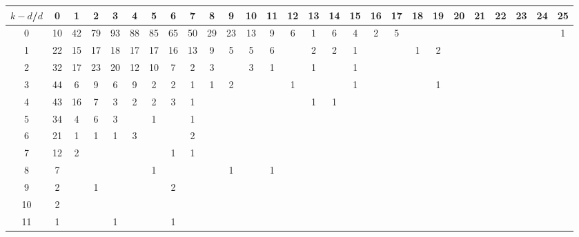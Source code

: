 \documentclass{article}[12pt]
\begin{document}
\begin{landscape}

\begin{table}[h]\footnotesize
{\centering
\begin{tabular}{|c|c|
c|c|c|c|c|c|c|c|c|c|c|c|c|c|c|c|c|c|c|c|c|c|c|c|c|}
  \hline
  $k-d$/$d$ 
 & 0 & 1 & 2 & 3 & 4 & 5 & 6 & 7 & 8 & 9 & 10 & 11 & 12 & 13 & 14 & 15 & 16 & 17 & 18 & 19 & 20 & 21 & 22 & 23 & 24 & 25\\

  \hline
  \hline

0  & 10 & 42 & 79 & 93 & 88 & 85 & 65 & 50 & 29 & 23 & 13 & 9 & 6 & 1 & 6 & 4 & 2 & 5 &  &  &  &  &  &  &  & 1\\

1  & 22 & 15 & 17 & 18 & 17 & 17 & 16 & 13 & 9 & 5 & 5 & 6 &  & 2 & 2 & 1 &  &  & 1 & 2 &  &  &  &  &  & \\

2  & 32 & 17 & 23 & 20 & 12 & 10 & 7 & 2 & 3 &  & 3 & 1 &  & 1 &  & 1 &  &  &  &  &  &  &  &  &  & \\

3  & 44 & 6 & 9 & 6 & 9 & 2 & 2 & 1 & 1 & 2 &  &  & 1 &  &  & 1 &  &  &  & 1 &  &  &  &  &  & \\

4  & 43 & 16 & 7 & 3 & 2 & 2 & 3 & 1 &  &  &  &  &  & 1 & 1 &  &  &  &  &  &  &  &  &  &  & \\

5  & 34 & 4 & 6 & 3 &  & 1 &  & 1 &  &  &  &  &  &  &  &  &  &  &  &  &  &  &  &  &  & \\

6  & 21 & 1 & 1 & 1 & 3 &  &  & 2 &  &  &  &  &  &  &  &  &  &  &  &  &  &  &  &  &  & \\

7  & 12 & 2 &  &  &  &  & 1 & 1 &  &  &  &  &  &  &  &  &  &  &  &  &  &  &  &  &  & \\

8  & 7 &  &  &  &  & 1 &  &  &  & 1 &  & 1 &  &  &  &  &  &  &  &  &  &  &  &  &  & \\

9  & 2 &  & 1 &  &  &  & 2 &  &  &  &  &  &  &  &  &  &  &  &  &  &  &  &  &  &  & \\

10  & 2 &  &  &  &  &  &  &  &  &  &  &  &  &  &  &  &  &  &  &  &  &  &  &  &  & \\

11  & 1 &  &  & 1 &  &  & 1 &  &  &  &  &  &  &  &  &  &  &  &  &  &  &  &  &  &  & \\


\end{tabular}}
\end{table}
\end{landscape}
\end{document}
